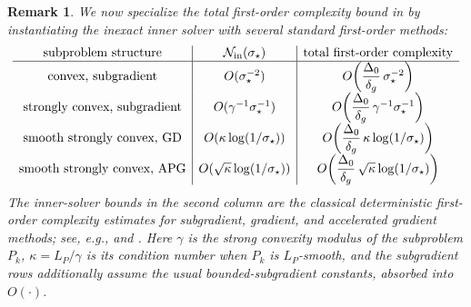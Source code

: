 \documentclass[english]{article}
\newtheorem{remark}{Remark}[section]
\begin{document}
\begin{remark}
\label{rem:dca-inexact-total-complexity}
We now specialize the total first-order complexity bound in
 by instantiating the inexact inner solver
with several standard first-order methods:
\[
\begin{array}{c|c|c}
\text{subproblem structure}
& \mathcal N_{\rm in}(\sigma_\star)
& \text{total first-order complexity}
\\ \hline
\text{convex, subgradient}
& O(\sigma_\star^{-2})
& O\!\left(\dfrac{\Delta_0}{\delta_g}\,\sigma_\star^{-2}\right)
\\
\text{strongly convex, subgradient}
& O(\gamma^{-1}\sigma_\star^{-1})
& O\!\left(\dfrac{\Delta_0}{\delta_g}\,\gamma^{-1}\sigma_\star^{-1}\right)
\\
\text{smooth strongly convex, GD}
& O(\kappa\log(1/\sigma_\star))
& O\!\left(\dfrac{\Delta_0}{\delta_g}\,\kappa\log(1/\sigma_\star)\right)
\\
\text{smooth strongly convex, APG}
& O(\sqrt{\kappa}\log(1/\sigma_\star))
& O\!\left(\dfrac{\Delta_0}{\delta_g}\,\sqrt{\kappa}\log(1/\sigma_\star)\right)
\end{array}
\]
The inner-solver bounds in the second column are the classical
deterministic first-order complexity estimates for subgradient, gradient,
and accelerated gradient methods; see, e.g.,
\citet[Chs.~3--4]{nesterov2018lectures} and
\citet[Chs.~3--5]{beck2017first}.
Here $\gamma$ is the strong convexity modulus of the subproblem $P_k$,
$\kappa=L_P/\gamma$ is its condition number when $P_k$ is $L_P$-smooth,
and the subgradient rows additionally assume the usual bounded-subgradient
constants, absorbed into $O(\cdot)$.


\end{remark}
\end{document}
